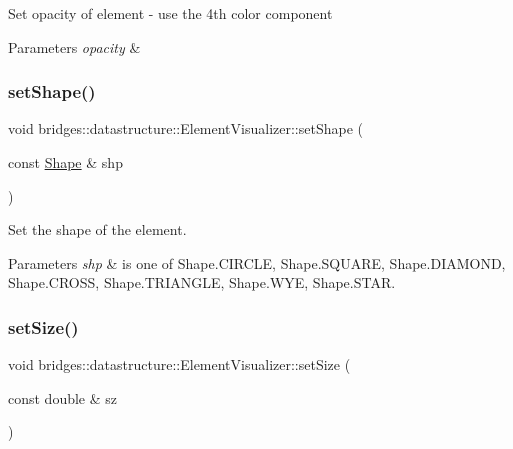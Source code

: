 Set opacity of element -\/ use the 4th color component


\begin{DoxyParams}{Parameters}
{\em opacity} & \\
\hline
\end{DoxyParams}
\mbox{\label{classbridges_1_1datastructure_1_1_element_visualizer_a316cccfc1e75ccbfdfe6d68da824b8b3}} 
\subsubsection{\texorpdfstring{set\+Shape()}{setShape()}}
{\footnotesize\ttfamily void bridges\+::datastructure\+::\+Element\+Visualizer\+::set\+Shape (\begin{DoxyParamCaption}\item[{const \mbox{\hyperlink{namespacebridges_1_1datastructure_a3408f5f44d9c6062e5f3adb7e1bbb7f0}{Shape}} \&}]{shp }\end{DoxyParamCaption})\hspace{0.3cm}{\ttfamily [inline]}}



Set the shape of the element. 


\begin{DoxyParams}{Parameters}
{\em shp} & is one of Shape.\+C\+I\+R\+C\+LE, Shape.\+S\+Q\+U\+A\+RE, Shape.\+D\+I\+A\+M\+O\+ND, Shape.\+C\+R\+O\+SS, Shape.\+T\+R\+I\+A\+N\+G\+LE, Shape.\+W\+YE, Shape.\+S\+T\+AR. \\
\hline
\end{DoxyParams}
\mbox{\label{classbridges_1_1datastructure_1_1_element_visualizer_a021333b1c20dd55627ac80ae3a2138e6}} 
\subsubsection{\texorpdfstring{set\+Size()}{setSize()}}
{\footnotesize\ttfamily void bridges\+::datastructure\+::\+Element\+Visualizer\+::set\+Size (\begin{DoxyParamCaption}\item[{const double \&}]{sz }\end{DoxyParamCaption})\hspace{0.3cm}{\ttfamily [inline]}}


